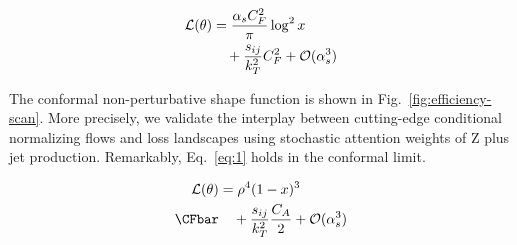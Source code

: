 \begin{align}
  \mathcal{L}(\theta) &= \frac{\alpha_s C_F^2}{\pi} \log^2 x \nonumber \\
  &\quad + \frac{s_{ij}}{k_T^2} C_F^2 + \mathcal{O}(\alpha_s^3) \label{eq:2}
\end{align}

The conformal non-perturbative shape function is shown in
Fig.~\ref{fig:efficiency-scan}. More precisely, we validate the
interplay between cutting-edge conditional normalizing flows and loss
landscapes using stochastic attention weights of Z plus jet production.
Remarkably, Eq.~\eqref{eq:1} holds in the conformal limit.

\begin{align}
  \mathcal{L}(\theta) &= {\rho}^{4} (1 - x)^{3} \nonumber \\ \CFbar
  &\quad + \frac{\sij}{\kT^2} \frac{\CA}{2} + \mathcal{O}(\as^3) \label{eq:4}
\end{align}

